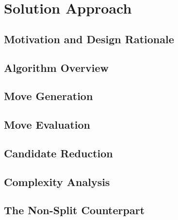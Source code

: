 %
%
%

\chapter{Solution Approach}
\label{ch:heuristic}

\section{Motivation and Design Rationale}
\label{sec:heu-motivation}

\section{Algorithm Overview}
\label{sec:heu-overview}

\section{Move Generation}
\label{sec:heu-moves}

\section{Move Evaluation}
\label{sec:heu-scoring}

\section{Candidate Reduction}
\label{sec:heu-candidates}

\section{Complexity Analysis}
\label{sec:heu-complexity}

\section{The Non-Split Counterpart}
\label{sec:heu-nosplit}

